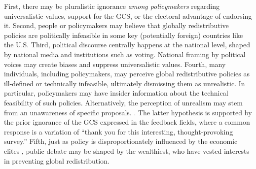 First, there may be pluralistic ignorance \textit{among policymakers} regarding universalistic values, support for the GCS, or the electoral advantage of endorsing it. Second, people or policymakers may believe that globally redistributive policies are politically infeasible in some key (potentially foreign) countries like the U.S. %
Third, political discourse centrally happens at the national level, shaped by national media and institutions such as voting. 
National framing by political voices may create biases and suppress universalistic values. %
Fourth, many individuals, including policymakers, may perceive global redistributive policies as ill-defined or technically infeasible, ultimately dismissing them as unrealistic. In particular, policymakers may have insider information about the technical feasibility of such policies. Alternatively, the perception of unrealism may stem from an unawareness of specific proposals. %
. %
The latter hypothesis is supported by the prior ignorance of the GCS expressed in the feedback fields, where a common response is a variation of ``thank you for this interesting, thought-provoking survey.'' 
Fifth, just as policy is disproportionately influenced by the economic elites \citep{gilens_testing_2014,persson_rich_2023}, public debate may be shaped by the wealthiest, who have vested interests in preventing global redistribution.

